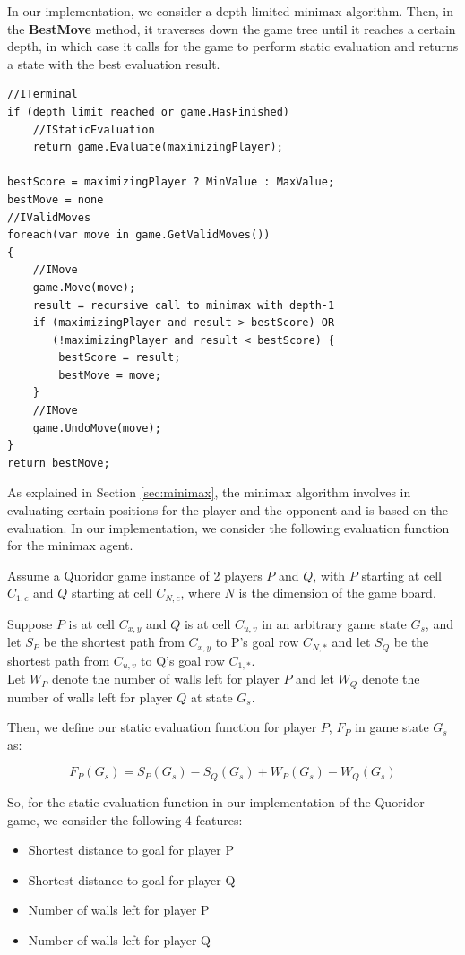 In our implementation, we consider a depth limited minimax algorithm.
Then, in the \textbf{BestMove} method, it traverses down the game tree until it reaches a certain depth, in which case it calls for the game to perform static evaluation and returns a state with the best evaluation result.
\begin{lstlisting}
//ITerminal
if (depth limit reached or game.HasFinished)
    //IStaticEvaluation
    return game.Evaluate(maximizingPlayer);

bestScore = maximizingPlayer ? MinValue : MaxValue;
bestMove = none
//IValidMoves
foreach(var move in game.GetValidMoves())
{
    //IMove
    game.Move(move);
    result = recursive call to minimax with depth-1
    if (maximizingPlayer and result > bestScore) OR
       (!maximizingPlayer and result < bestScore) {
        bestScore = result;
        bestMove = move;
    }
    //IMove
    game.UndoMove(move);
}
return bestMove;
\end{lstlisting}

As explained in Section \ref{sec:minimax}, the minimax algorithm involves in evaluating certain positions for the player and the opponent and is based on the evaluation. In our implementation, we consider the following evaluation function for the minimax agent.

Assume a Quoridor game instance of 2 players $P$ and $Q$, with $P$ starting at cell $C_{1,c}$ and $Q$ starting at cell $C_{N,c}$, where $N$ is the dimension of the game board.

Suppose $P$ is at cell $C_{x,y}$ and $Q$ is at cell $C_{u,v}$ in an arbitrary game state $G_s$, and let $S_P$ be the shortest path from $C_{x,y}$ to P's goal row $C_{N,*}$ and let $S_Q$ be the shortest path from $C_{u,v}$ to Q's goal row $C_{1,*}$.\\
Let $W_P$ denote the number of walls left for player $P$ and let $W_Q$ denote the number of walls left for player $Q$ at state $G_s$.

Then, we define our static evaluation function for player $P$, $F_P$ in game state $G_s$ as:

\begin{equation}
    F_P(G_s) = S_P(G_s) - S_Q(G_s) + W_P(G_s) - W_Q(G_s)
\end{equation}

So, for the static evaluation function in our implementation of the Quoridor game, we consider the following 4 features:
\begin{itemize}
    \item Shortest distance to goal for player P
    \item Shortest distance to goal for player Q
    \item Number of walls left for player P
    \item Number of walls left for player Q
\end{itemize}
 

